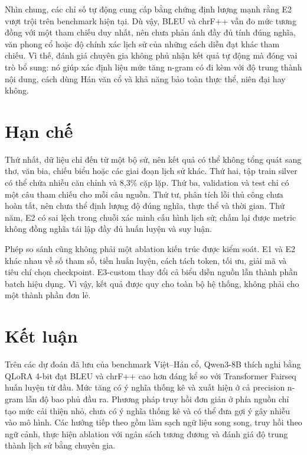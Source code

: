 \documentclass[11pt,twocolumn]{article}
\begin{document}
Nhìn chung, các chỉ số tự động cung cấp bằng chứng định lượng mạnh rằng E2
vượt trội trên benchmark hiện tại. Dù vậy, BLEU và chrF++ vẫn đo mức tương
đồng với một tham chiếu duy nhất, nên chưa phản ánh đầy đủ tính đúng nghĩa,
văn phong cổ hoặc độ chính xác lịch sử của những cách diễn đạt khác tham
chiếu. Vì thế, đánh giá chuyên gia không phủ nhận kết quả tự động mà đóng
vai trò bổ sung: nó giúp xác định liệu mức tăng n-gram có đi kèm với độ trung
thành nội dung, cách dùng Hán văn cổ và khả năng bảo toàn thực thể, niên đại
hay không.


\section{Hạn chế}

Thứ nhất, dữ liệu chỉ đến từ một bộ sử, nên kết quả có thể không tổng quát sang
thơ, văn bia, chiếu biểu hoặc các giai đoạn lịch sử khác. Thứ hai, tập train
silver có thể chứa nhiễu căn chỉnh và 8,3\% cặp lặp. Thứ ba, validation và test
chỉ có một câu tham chiếu cho mỗi câu nguồn. Thứ tư, phân tích lỗi thủ công
chưa hoàn tất, nên chưa thể định lượng độ đúng nghĩa, thực thể và thời gian.
Thứ năm, E2 có sai lệch trong chuỗi xác minh cấu hình lịch sử;
chấm lại được metric không đồng nghĩa tái lập đầy đủ huấn luyện và suy luận.

Phép so sánh cũng không phải một ablation kiến trúc được kiểm soát. E1 và E2
khác nhau về số tham số, tiền huấn luyện, cách tách token, tối ưu, giải mã và
tiêu chí chọn checkpoint. E3-custom thay đổi cả biểu diễn nguồn lẫn thành phần
batch hiệu dụng. Vì vậy, kết quả được quy cho toàn bộ hệ thống, không phải
cho một thành phần đơn lẻ.


\section{Kết luận}

Trên các dự đoán đã lưu của benchmark Việt--Hán cổ, Qwen3-8B thích nghi
bằng QLoRA 4-bit đạt BLEU và chrF++ cao hơn đáng kể so với Transformer
Fairseq huấn luyện từ đầu. Mức tăng có ý nghĩa thống kê và xuất hiện ở cả precision n-gram lẫn độ
bao phủ đầu ra. Phương pháp truy hồi đơn giản ở phía nguồn chỉ tạo mức cải
thiện nhỏ, chưa có ý nghĩa thống kê và có thể đưa gợi ý gây nhiễu vào mô hình.
Các hướng tiếp theo gồm làm sạch ngữ liệu song song, truy hồi theo ngữ cảnh,
thực hiện ablation với ngân sách tương đương và đánh giá độ trung thành lịch sử
bằng chuyên gia.

{\small\raggedright


}
\end{document}
